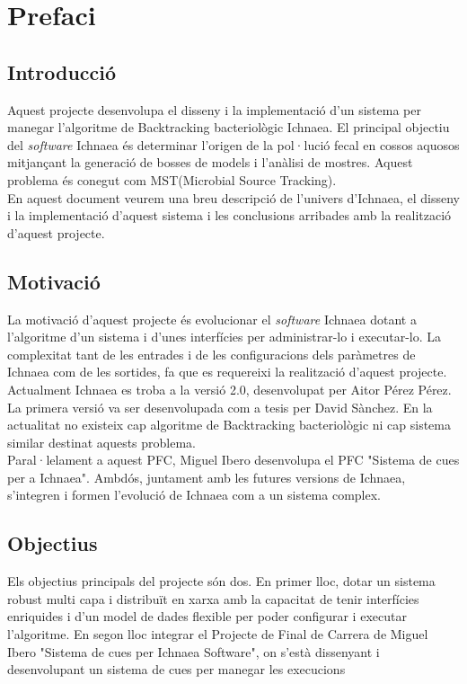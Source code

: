 \chapter{Prefaci}
\label{cha:prefaci}

\section{Introducció}
\label{sec:abast}
Aquest projecte desenvolupa el disseny i la implementació d'un sistema per manegar l'algoritme de Backtracking bacteriològic Ichnaea. El principal objectiu del \textit{software} Ichnaea \'{e}s determinar l'origen de la pol·lució fecal en cossos aquosos mitjançant la generació de bosses de models i l'anàlisi de mostres. Aquest problema \'{e}s conegut com MST(Microbial Source Tracking).\\

En aquest document veurem una breu descripció de l'univers d'Ichnaea, el disseny i la implementació d'aquest sistema i les conclusions arribades amb la realització d'aquest projecte.

\section{Motivació}
La motivació d'aquest projecte \'{e}s evolucionar el \textit{software} Ichnaea dotant a l'algoritme d'un sistema i d'unes interfícies per administrar-lo i executar-lo. La complexitat tant de les entrades i de les configuracions dels paràmetres de Ichnaea com de les sortides, fa que es requereixi la realització d'aquest projecte.\\

Actualment Ichnaea es troba a la versi\'{o} 2.0, desenvolupat per Aitor P\'{e}rez P\'{e}rez. La primera versi\'{o} va ser desenvolupada com a tesis per David Sànchez. En la actualitat no existeix cap algoritme de Backtracking bacteriològic ni cap sistema similar destinat aquests problema.\\

Paral·lelament a aquest PFC, Miguel Ibero desenvolupa el PFC "Sistema de cues per a Ichnaea". Ambdós, juntament amb les futures versions de Ichnaea, s'integren i formen l'evolució de Ichnaea com a un sistema complex.

\section{Objectius}
\label{sec:objetius}
Els objectius principals del projecte s\'{o}n dos. En primer lloc, dotar un sistema robust multi capa i distribuït en xarxa amb la capacitat de tenir  interfícies enriquides i d'un model de dades flexible per poder configurar i executar l'algoritme. En segon lloc integrar el Projecte de Final de Carrera de Miguel Ibero "Sistema de cues per Ichnaea Software", on s'est\`{a} dissenyant i desenvolupant un sistema de cues per manegar les execucions\\

